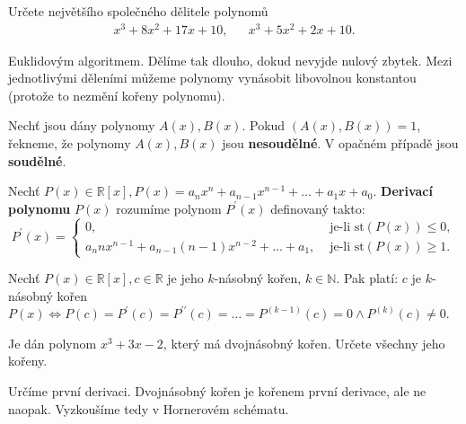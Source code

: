 \begin{priklad}
    Určete největšího společného dělitele polynomů
    \begin{align*}
        x^3+8x^2+17x+10,& &   x^3+5x^2+2x+10.
    \end{align*}
\end{priklad}

\begin{reseni}
Euklidovým algoritmem. Dělíme tak dlouho, dokud nevyjde nulový zbytek.
Mezi jednotlivými děleními můžeme polynomy vynásobit libovolnou konstantou (protože
to nezmění kořeny polynomu).
\end{reseni}

\begin{definition}
  Nechť jsou dány polynomy $A(x), B(x)$. Pokud $(A(x), B(x)) = 1$, řekneme, že polynomy $A(x), B(x)$ jsou \textbf{nesoudělné}. V opačném případě jsou \textbf{soudělné}.
\end{definition}

\begin{definition}
    Nechť $P(x) \in \mathbb R[x], P(x)=a_nx^n+a_{n-1}x^{n-1}+\dots+a_1x+a_0.$ \textbf{Derivací polynomu} $P(x)$ rozumíme polynom $P^\prime(x)$ definovaný takto:
    $$
        P^\prime(x)=\begin{cases}
        0, &\text{ je-li st} (P(x)) \leq 0,\\
        a_n n x^{n-1} + a_{n-1}(n-1)x^{n-2} + \dots + a_1, & \text{ je-li st} (P(x)) \geq 1.
        \end{cases}
    $$
\end{definition}


\begin{veta}
    Nechť $P(x) \in \mathbb R[x], c \in \mathbb R$ je jeho $k$-násobný kořen, $k\in \mathbb N.$ Pak platí: $c$ je
    $k$-násobný kořen $P(x) \iff P(c)=P^\prime(c)=P^{\prime \prime}(c)=\dots= P^{(k-1)}(c)=0 \land P^{(k)}(c)\ne 0$.
\end{veta}


\begin{priklad}
Je dán polynom $x^3+3x-2$, který má dvojnásobný kořen.
Určete všechny jeho kořeny.
\end{priklad}

\begin{reseni}
Určíme první derivaci. Dvojnásobný kořen je kořenem první derivace, ale ne naopak.
Vyzkoušíme tedy v Hornerovém schématu.
\end{reseni}
